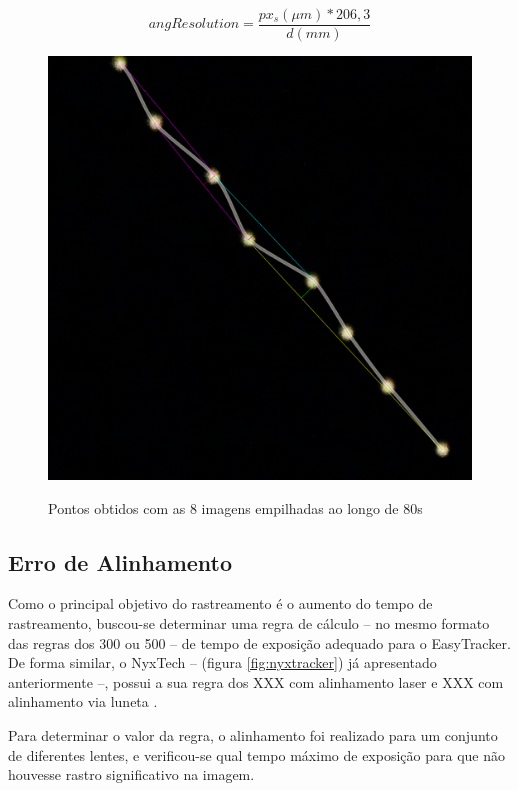 \begin{equation}
	angResolution = \dfrac{px_s (\mu m) * 206,3}{d (mm)}
	\label{eq:arc}
\end{equation}

\begin{figure}[htb]
	\centering
	\caption{Pontos obtidos com as 8 imagens empilhadas ao longo de 80s}
	\includegraphics[width=.5\linewidth]{figuras/resultados/periodicErrorImage}
	\label{fig:periodicErrorImage}
\end{figure}


\subsection{Erro de Alinhamento}

Como o principal objetivo do rastreamento é o aumento do tempo de rastreamento, buscou-se determinar uma regra de cálculo -- no mesmo formato das regras dos 300 ou 500 -- de tempo de exposição adequado para o EasyTracker. De forma similar, o NyxTech -- (figura \ref{fig:nyxtracker}) já apresentado anteriormente --, possui a sua regra dos XXX com alinhamento laser e XXX com alinhamento via luneta \cite{}.

Para determinar o valor da regra, o alinhamento foi realizado para um conjunto de diferentes lentes, e verificou-se qual tempo máximo de exposição para que não houvesse rastro significativo na imagem. 

